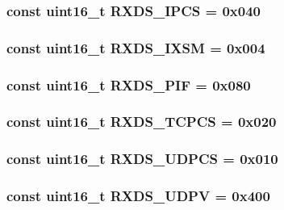 \label{namespaceiGbReg_a4bf1dbf21e11b2b4709870ea28923795}
\hypertarget{namespaceiGbReg_a9b0cee9a8ec0a27995db39860d0ce4e1}{
\subsubsection[{RXDS\_\-IPCS}]{\setlength{\rightskip}{0pt plus 5cm}const uint16\_\-t {\bf RXDS\_\-IPCS} = 0x040}}
\label{namespaceiGbReg_a9b0cee9a8ec0a27995db39860d0ce4e1}
\hypertarget{namespaceiGbReg_aafdc831ca3b4b37ff432587453d386f6}{
\subsubsection[{RXDS\_\-IXSM}]{\setlength{\rightskip}{0pt plus 5cm}const uint16\_\-t {\bf RXDS\_\-IXSM} = 0x004}}
\label{namespaceiGbReg_aafdc831ca3b4b37ff432587453d386f6}
\hypertarget{namespaceiGbReg_a521f1e9609640a6286ad12c4dd331833}{
\subsubsection[{RXDS\_\-PIF}]{\setlength{\rightskip}{0pt plus 5cm}const uint16\_\-t {\bf RXDS\_\-PIF} = 0x080}}
\label{namespaceiGbReg_a521f1e9609640a6286ad12c4dd331833}
\hypertarget{namespaceiGbReg_aae99bf9f9557cc9d2719664210d34678}{
\subsubsection[{RXDS\_\-TCPCS}]{\setlength{\rightskip}{0pt plus 5cm}const uint16\_\-t {\bf RXDS\_\-TCPCS} = 0x020}}
\label{namespaceiGbReg_aae99bf9f9557cc9d2719664210d34678}
\hypertarget{namespaceiGbReg_a390b7297c53140bdea8b79e91d128150}{
\subsubsection[{RXDS\_\-UDPCS}]{\setlength{\rightskip}{0pt plus 5cm}const uint16\_\-t {\bf RXDS\_\-UDPCS} = 0x010}}
\label{namespaceiGbReg_a390b7297c53140bdea8b79e91d128150}
\hypertarget{namespaceiGbReg_a8ba647bd48d3efd4636a1aad66243bbe}{
\subsubsection[{RXDS\_\-UDPV}]{\setlength{\rightskip}{0pt plus 5cm}const uint16\_\-t {\bf RXDS\_\-UDPV} = 0x400}}
